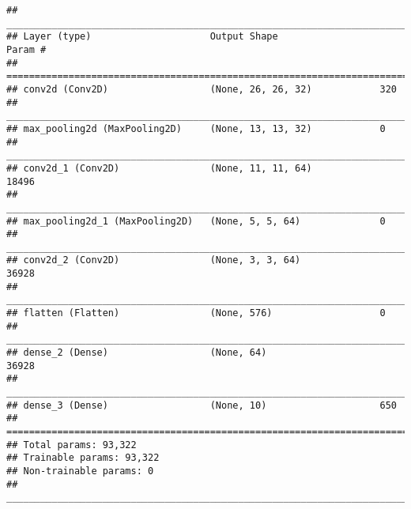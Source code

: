 \documentclass[]{article}
\begin{document}
\begin{verbatim}
## ___________________________________________________________________________
## Layer (type)                     Output Shape                  Param #     
## ===========================================================================
## conv2d (Conv2D)                  (None, 26, 26, 32)            320         
## ___________________________________________________________________________
## max_pooling2d (MaxPooling2D)     (None, 13, 13, 32)            0           
## ___________________________________________________________________________
## conv2d_1 (Conv2D)                (None, 11, 11, 64)            18496       
## ___________________________________________________________________________
## max_pooling2d_1 (MaxPooling2D)   (None, 5, 5, 64)              0           
## ___________________________________________________________________________
## conv2d_2 (Conv2D)                (None, 3, 3, 64)              36928       
## ___________________________________________________________________________
## flatten (Flatten)                (None, 576)                   0           
## ___________________________________________________________________________
## dense_2 (Dense)                  (None, 64)                    36928       
## ___________________________________________________________________________
## dense_3 (Dense)                  (None, 10)                    650         
## ===========================================================================
## Total params: 93,322
## Trainable params: 93,322
## Non-trainable params: 0
## ___________________________________________________________________________
\end{verbatim}
\end{document}
